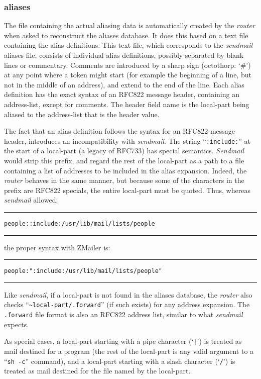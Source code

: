 \subsubsection{aliases}

The file containing the actual aliasing data is automatically created by
the {\em router} when asked to reconstruct the aliases database.  It does this
based on a text file containing the alias definitions.  This text file,
which corresponds to the {\em sendmail} aliases file, consists of individual
alias definitions, possibly separated by blank lines or commentary.
Comments are introduced by a sharp sign (octothorp: `\#') at any point where
a token might start (for example the beginning of a line, but not in the
middle of an address), and extend to the end of the line.  Each alias
definition has the exact syntax of an RFC822 message header, containing an
address-list, except for comments.  The header field name is the local-part
being aliased to the address-list that is the header value.

The fact that an alias definition follows the syntax for an RFC822 message
header, introduces an incompatibility with {\em sendmail}.
The string ``{\tt :include:}'' at the start of a local-part
(a legacy of RFC733) has special semantics.
{\em Sendmail} would strip this prefix, and regard the rest of the local-part
as a path to a file containing a list of addresses to be included in the alias
expansion.
Indeed, the {\em router} behaves in the same manner, but because some of
the characters in the prefix are RFC822 specials, the entire local-part
must be quoted.
Thus, whereas {\em sendmail} allowed:

\begin{alltt}\medskip\hrule\medskip
people: :include:/usr/lib/mail/lists/people
\medskip\hrule\end{alltt}\medskip

the proper syntax with ZMailer is:
\begin{alltt}\medskip\hrule\medskip
people: ":include:/usr/lib/mail/lists/people"
\medskip\hrule\end{alltt}\medskip


Like {\em sendmail}, if a local-part is not found in the aliases database,
the {\em router} also checks ``{\tt \~{}local-part/.forward}''
(if such exists) for any address expansion.
The {\tt .forward} file format is also an RFC822 address list, similar
to what {\em sendmail} expects.

As special cases, a local-part starting with a pipe character (`\verb/|/')
is treated as mail destined for a program (the rest of the local-part is any
valid argument to a ``{\tt sh -c}'' command), and a local-part starting with
a slash character (`{\tt /}') is treated as mail destined for the file named
by the local-part.

